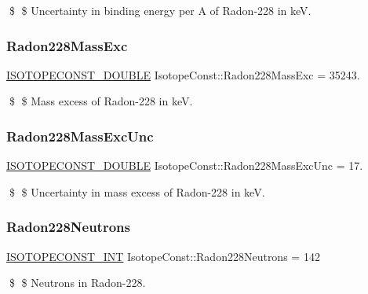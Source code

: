 \$ \$ Uncertainty in binding energy per A of Radon-\/228 in keV. \mbox{\label{group___isotope_const-_radon-_rn228_ga18095b61cd6d11888b7e67e0f6e6f9d3}} 
\subsubsection{\texorpdfstring{Radon228\+Mass\+Exc}{Radon228MassExc}}
{\footnotesize\ttfamily \mbox{\hyperlink{group___isotope_const-_macros_ga8f45a7272ce02c0b4c65c44636ed719a}{I\+S\+O\+T\+O\+P\+E\+C\+O\+N\+S\+T\+\_\+\+D\+O\+U\+B\+LE}} Isotope\+Const\+::\+Radon228\+Mass\+Exc = 35243.}

\$ \$ Mass excess of Radon-\/228 in keV. \mbox{\label{group___isotope_const-_radon-_rn228_ga1ebdd2a26afb63911e951e5caf9f6dc3}} 
\subsubsection{\texorpdfstring{Radon228\+Mass\+Exc\+Unc}{Radon228MassExcUnc}}
{\footnotesize\ttfamily \mbox{\hyperlink{group___isotope_const-_macros_ga8f45a7272ce02c0b4c65c44636ed719a}{I\+S\+O\+T\+O\+P\+E\+C\+O\+N\+S\+T\+\_\+\+D\+O\+U\+B\+LE}} Isotope\+Const\+::\+Radon228\+Mass\+Exc\+Unc = 17.}

\$ \$ Uncertainty in mass excess of Radon-\/228 in keV. \mbox{\label{group___isotope_const-_radon-_rn228_ga2ba11ba3cfeb2688146f93746c58528b}} 
\subsubsection{\texorpdfstring{Radon228\+Neutrons}{Radon228Neutrons}}
{\footnotesize\ttfamily \mbox{\hyperlink{group___isotope_const-_macros_ga5f18360b3e99483a35c32d789e62621c}{I\+S\+O\+T\+O\+P\+E\+C\+O\+N\+S\+T\+\_\+\+I\+NT}} Isotope\+Const\+::\+Radon228\+Neutrons = 142}

\$ \$ Neutrons in Radon-\/228. \mbox{\label{group___isotope_const-_radon-_rn228_ga1f86d1cdf1e4bf0e2f2bb1f06db33ea8}} 
